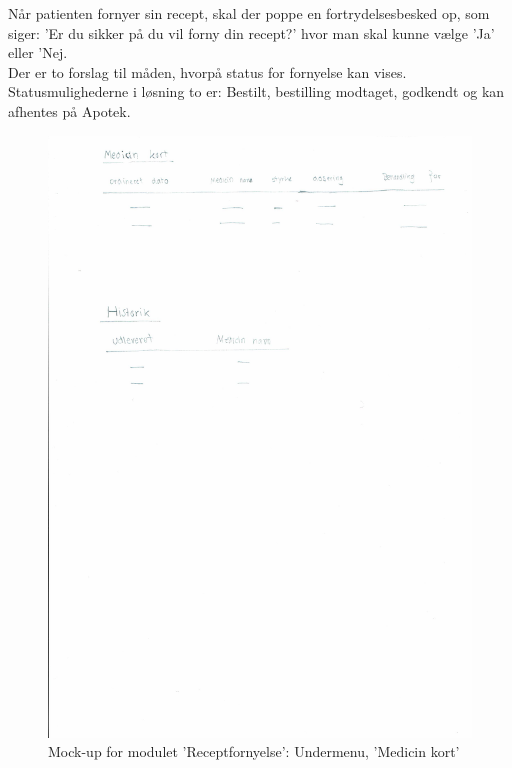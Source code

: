 Når patienten fornyer sin recept, skal der poppe en fortrydelsesbesked op, som siger: 'Er du sikker på du vil forny din recept?' hvor man skal kunne vælge 'Ja' eller 'Nej.\\
Der er to forslag til måden, hvorpå status for fornyelse kan vises. Statusmulighederne i løsning to er: Bestilt, bestilling modtaget, godkendt og kan afhentes på Apotek.\\
\begin{figure}[H]
	\centering
	\includegraphics[angle=0, width=\linewidth]{Materials/FornyRecept_Medicinkort.pdf}
	\caption{Mock-up for modulet 'Receptfornyelse': Undermenu, 'Medicin kort'}
	\label{fig:Mock-Up3}
\end{figure}
